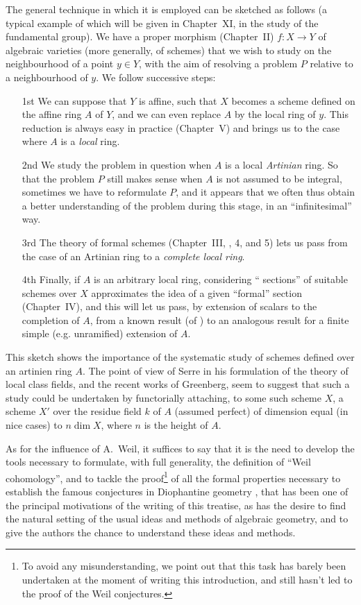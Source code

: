 The general technique in which it is employed can be sketched as follows (a
typical example of which will be given in Chapter~XI, in the study of the
fundamental group). We have a proper morphism (Chapter~II) $f:X\to Y$ of
algebraic varieties (more generally, of schemes) that we wish to study on the
neighbourhood of a point $y\in Y$, with the aim of resolving a problem $P$
relative to a neighbourhood of $y$. We follow successive steps:
\begin{itemize}
  \item[1st]
     We can suppose that $Y$ is affine, such that $X$ becomes a scheme
     defined on the affine ring $A$ of $Y$, and we can even replace $A$
     by the local ring of $y$. This reduction is always easy in practice
     (Chapter~V) and brings us to the case where $A$ is a {\it local} ring.
  \item[2nd]
     We study the problem in question when $A$ is a local {\it Artinian}
     ring. So that the problem $P$ still makes sense when $A$ is not
     assumed to be integral, sometimes we have to reformulate $P$, and it
     appears that we often thus obtain a better understanding of the problem
     during this stage, in an ``infinitesimal'' way.
  \item[3rd]
     The theory of formal schemes
     (Chapter~III, \textsection{}, 4, and 5) lets us pass from the
     case of an Artinian ring to a {\it complete local ring}.
  \item[4th]
     Finally, if $A$ is an arbitrary local ring, considering
     `` sections'' of suitable schemes over $X$
     approximates the idea of a given ``formal'' section (Chapter~IV), and
     this will let us pass,
     by extension of scalars to the completion of $A$, from a known result (of
     \completelyunsure) to an analogous result for a finite simple
     (e.g. unramified) extension of $A$.
\end{itemize}

This sketch shows the importance of the systematic study of schemes defined over
an artinien ring $A$. The point of view of Serre in his formulation of the
theory of local class fields, and the recent works of Greenberg, seem
to suggest that such a study could be undertaken by functorially attaching, to
some such scheme $X$, a scheme $X'$ over the residue field $k$ of $A$ (assumed
perfect) of dimension equal (in nice cases) to $n\dim X$, where $n$ is
the height of $A$.

As for the influence of A.~Weil, it suffices to say that it is the need to
develop the tools necessary to formulate, with full generality, the definition
of ``Weil cohomology'', and to tackle the proof\footnote{To avoid any
misunderstanding, we point out that this task has barely been undertaken at the
moment of writing this introduction, and still hasn't led to the proof of the
Weil conjectures.} of all the formal properties necessary to establish the
famous conjectures in Diophantine geometry \cite{I-19}, that has been one of the
principal motivations of the writing of this treatise, as has the desire to find
the natural setting of the usual ideas and methods of algebraic geometry, and to
give the authors the chance to understand these ideas and methods.

